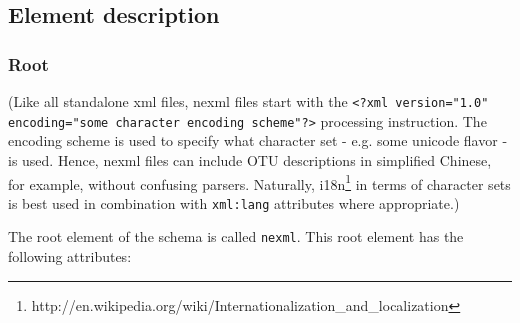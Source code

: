 \documentclass{article}
\newcommand{\code}{\texttt} \usepackage{fullpage}
\begin{document}
\subsection{Element description}

\subsubsection{Root} 

(Like all standalone xml files, nexml files start with the \code{<?xml
version="1.0" encoding="some character encoding scheme"?>} processing
instruction. The encoding scheme is used to specify what character set -
e.g. some unicode flavor - is used. Hence, nexml files can include OTU
descriptions in simplified Chinese, for example, without confusing
parsers. Naturally,
i18n\footnote{http://en.wikipedia.org/wiki/Internationalization\_and\_localization} 
in terms of character sets is best used in combination
with \code{xml:lang} attributes where appropriate.)

The root element of the schema is called \code{nexml}. This root element
has the following attributes:
\end{document}
